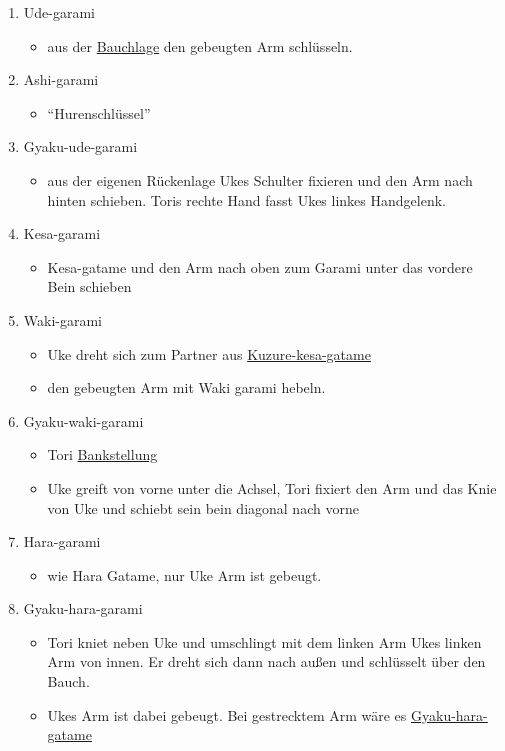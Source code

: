 \documentclass[justified, a4paper, notitlepage, captions=tableheading, nobib]{tufte-handout}
\begin{document}
\begin{itemize}
\begin{enumerate}
\item \label{org1b248c7}Ude-garami 
\begin{itemize}
\item aus der \hyperref[orgffa54d6]{Bauchlage} den gebeugten Arm schlüsseln.
\end{itemize}
\item \label{org1fbee98}Ashi-garami 
\begin{itemize}
\item "`Hurenschlüssel"'
\end{itemize}
\item \label{orgff818ef}Gyaku-ude-garami
\begin{itemize}
\item aus der eigenen Rückenlage Ukes Schulter fixieren und den Arm nach hinten schieben. Toris rechte Hand fasst Ukes linkes Handgelenk.
\end{itemize}
\item \label{org7487385}Kesa-garami
\begin{itemize}
\item Kesa-gatame und den Arm nach oben zum Garami unter das vordere Bein schieben
\end{itemize}
\item \label{orgb8769d9}Waki-garami 
\begin{itemize}
\item Uke dreht sich zum Partner aus \hyperref[orgc8ed1bd]{Kuzure-kesa-gatame}
\item den gebeugten Arm mit  Waki garami hebeln.
\end{itemize}
\item \label{org6ef2e15}Gyaku-waki-garami
\begin{itemize}
\item Tori \hyperref[orgf95c5ab]{Bankstellung}
\item Uke greift von vorne unter die Achsel, Tori fixiert den Arm und das Knie von Uke und schiebt sein bein diagonal nach vorne
\end{itemize}
\item \label{org7cdb499}Hara-garami 
\begin{itemize}
\item wie Hara Gatame, nur Uke Arm ist gebeugt.
\end{itemize}
\item \label{org8e46dd3}Gyaku-hara-garami 
\begin{itemize}
\item Tori kniet neben Uke und umschlingt mit dem linken Arm Ukes linken Arm von innen. Er dreht sich dann nach außen und schlüsselt über den Bauch.
\item Ukes Arm ist dabei gebeugt. Bei gestrecktem Arm wäre es \hyperref[org2e6da0d]{Gyaku-hara-gatame}
\end{itemize}
\end{enumerate}
\end{itemize}
\end{document}
